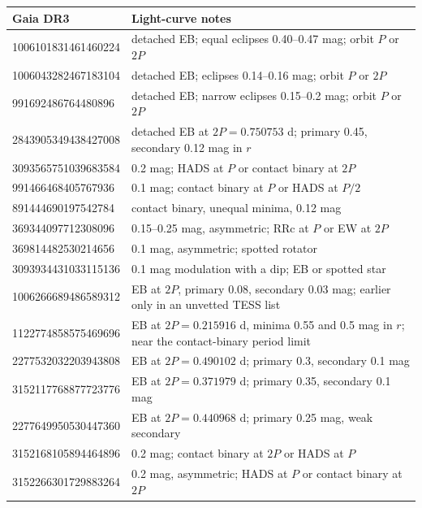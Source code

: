 \documentclass[11pt]{article}
\begin{document}
{\small
\begin{longtable}{>{\raggedright}p{4.2cm}p{11cm}}
\toprule Gaia DR3 & Light-curve notes\\\midrule
1006101831461460224 & detached EB; equal eclipses 0.40--0.47 mag; orbit $P$ or $2P$ \\
1006043282467183104 & detached EB; eclipses 0.14--0.16 mag; orbit $P$ or $2P$ \\
991692486764480896 & detached EB; narrow eclipses 0.15--0.2 mag; orbit $P$ or $2P$ \\
2843905349438427008 & detached EB at $2P=0.750753$ d; primary 0.45, secondary 0.12 mag in $r$ \\
3093565751039683584 & 0.2 mag; HADS at $P$ or contact binary at $2P$ \\
991466468405767936 & 0.1 mag; contact binary at $P$ or HADS at $P/2$ \\
891444690197542784 & contact binary, unequal minima, 0.12 mag \\
369344097712308096 & 0.15--0.25 mag, asymmetric; RRc at $P$ or EW at $2P$ \\
369814482530214656 & 0.1 mag, asymmetric; spotted rotator \\
3093934431033115136 & 0.1 mag modulation with a dip; EB or spotted star \\
1006266689486589312 & EB at $2P$, primary 0.08, secondary 0.03 mag; earlier only in an unvetted TESS list \\
1122774858575469696 & EB at $2P=0.215916$ d, minima 0.55 and 0.5 mag in $r$; near the contact-binary period limit \\
2277532032203943808 & EB at $2P=0.490102$ d; primary 0.3, secondary 0.1 mag \\
3152117768877723776 & EB at $2P=0.371979$ d; primary 0.35, secondary 0.1 mag \\
2277649950530447360 & EB at $2P=0.440968$ d; primary 0.25 mag, weak secondary \\
3152168105894464896 & 0.2 mag; contact binary at $2P$ or HADS at $P$ \\
3152266301729883264 & 0.2 mag, asymmetric; HADS at $P$ or contact binary at $2P$ \\
\bottomrule\end{longtable}}
\end{document}
